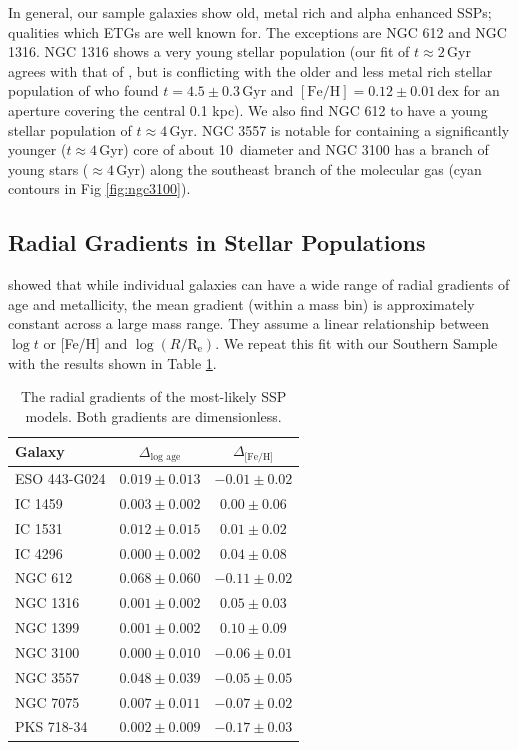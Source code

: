 \documentclass[a4paper,fleqn,usenatbib]{mnras}
\begin{document}
	In general, our sample galaxies show old, metal rich and alpha enhanced SSPs; qualities which ETGs are well known for. The exceptions are NGC 612 and NGC 1316. NGC 1316 shows a very young stellar population (our fit of $t \approx 2$\,Gyr agrees with that of \citealt{Kuntschner2000}, but is conflicting with the older and less metal rich stellar population of \citealt{Koleva2011} who found $t=4.5 \pm 0.3 \,\mathrm{Gyr}$ and $\mathrm{[Fe/H]}=0.12 \pm 0.01 \,\mathrm{dex}$ for an aperture covering the central 0.1 kpc). We also find NGC 612 to have a young stellar population of $t\approx 4\,\mathrm{Gyr}$. NGC 3557 is notable for containing a significantly younger ($t\approx 4$\,Gyr) core of about 10\arcsec\ diameter and NGC 3100 has a branch of young stars ($\approx 4$\,Gyr) along the southeast branch of the molecular gas (cyan contours in Fig \ref{fig:ngc3100}).

	\subsection{Radial Gradients in Stellar Populations}
		\label{subsec:popGrad}

		\citet{Koleva2011} showed that while individual galaxies can have a wide range of radial gradients of age and metallicity, the mean gradient (within a mass bin) is approximately constant across a large mass range. They assume a linear relationship between $\log t$ or [Fe/H] and $\log (R/\mathrm{R_e})$. We repeat this fit with our Southern Sample with the results shown in Table \ref{tab:popGrad}. 

		\begin{table}
			\centering
			\caption{The radial gradients of the most-likely SSP models. Both gradients are dimensionless.}
			\label{tab:popGrad}
			\begin{tabular}{l c c}
				\hline
				\hline 
				Galaxy 	& $\Delta_\text{log age}$ & $\Delta_\text{[Fe/H]}$ \\ 
				\hline
				ESO 443-G024 & $0.019 \pm 0.013$ & $-0.01 \pm 0.02$ \\
				IC 1459 	& $0.003 \pm 0.002$ & $0.00 \pm 0.06$ \\
				IC 1531 	& $0.012 \pm 0.015$ & $0.01 \pm 0.02$ \\
				IC 4296		& $0.000 \pm 0.002$ & $0.04 \pm 0.08$ \\
				NGC 612 	& $0.068 \pm 0.060$ & $-0.11 \pm 0.02$ \\
				NGC 1316 	& $0.001 \pm 0.002$ & $0.05 \pm 0.03$ \\
				NGC 1399 	& $0.001 \pm 0.002$ & $0.10 \pm 0.09$ \\
				NGC 3100 	& $0.000 \pm 0.010$ & $-0.06 \pm 0.01$ \\
				NGC 3557 	& $0.048 \pm 0.039$ & $-0.05 \pm 0.05$ \\
				NGC 7075 	& $0.007 \pm 0.011$ & $-0.07 \pm 0.02$ \\
				PKS 718-34  & $0.002 \pm 0.009$ & $-0.17 \pm 0.03$ \\
				\hline
				\hline
			\end{tabular}
		\end{table}
\end{document}
